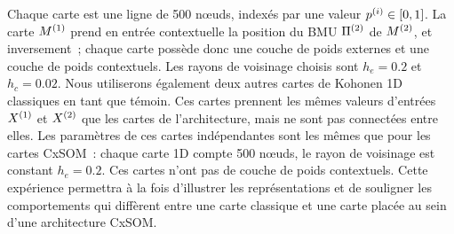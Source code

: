 \documentclass[../main]{subfiles}
\begin{document}
Chaque carte est une ligne de 500 n\oe{}uds, indexés par une valeur $p^{({i})} \in [0,1]$.
La carte $M^{({1})}$ prend en entrée contextuelle la position du BMU $\Pi^{({2})}$ de $M^{({2})}$, et inversement~; chaque carte possède donc une couche de poids externes et une couche de poids contextuels. Les rayons de voisinage choisis sont $h_e = 0.2$ et $h_c = 0.02$.
Nous utiliserons également deux autres cartes de Kohonen 1D classiques en tant que témoin.
Ces cartes prennent les mêmes valeurs d'entrées $X^{({1})}$ et $X^{({2})}$ que les cartes de l'architecture, mais ne sont pas connectées entre elles. 
Les paramètres de ces cartes indépendantes sont les mêmes que pour les cartes CxSOM~: chaque carte 1D compte 500 n\oe{}uds, le rayon de voisinage est constant $h_e = 0.2$. Ces cartes n'ont pas de couche de poids contextuels.
Cette expérience permettra à la fois d'illustrer les représentations et de souligner les comportements qui diffèrent entre une carte classique et une carte placée au sein d'une architecture CxSOM.
\end{document}
